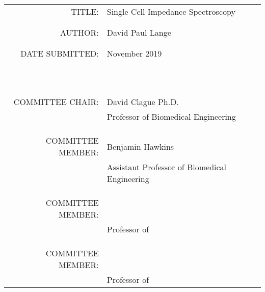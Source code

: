 \vspace{0.5 in}

\begin{tabular}{r l}
    TITLE:\;\;\;\;\; & Single Cell Impedance Spectroscopy\\
    \\
    \\
    AUTHOR:\;\;\;\;\; & David Paul Lange\\
    \\
    \\
    DATE SUBMITTED:\;\;\;\;\;\; & November 2019\\
    \\
    \\
    \\
    \\
    \\
    \\
    \\
    \\
    \\
    \\
    \\
    COMMITTEE CHAIR:\;\;\;\;\; & David Clague Ph.D.\\ 
    \;\;\;\;\; & Professor of Biomedical Engineering\\
    \\
    \\
    \\
    COMMITTEE MEMBER: \;\;\;\;\; & Benjamin Hawkins\\
    \;\;\;\;\; & Assistant Professor of Biomedical Engineering\\
    \\
    \\
    \\
    COMMITTEE MEMBER: \;\;\;\;\; & \\
    \;\;\;\;\; & Professor of \\
    \\
    \\
    \\
    COMMITTEE MEMBER: \;\;\;\;\; & \\
    \;\;\;\;\; & Professor of \\
\end{tabular}


